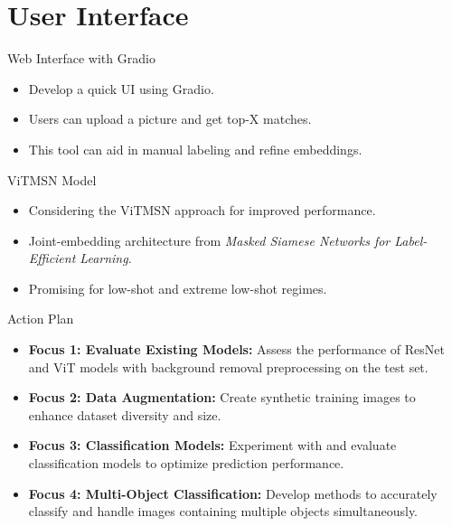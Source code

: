 \documentclass{beamer}
\begin{document}
\section{User Interface}
\begin{frame}{Web Interface with Gradio}
\begin{itemize}
    \item Develop a quick UI using Gradio.
    \item Users can upload a picture and get top-X matches.
    \item This tool can aid in manual labeling and refine embeddings.
\end{itemize}
\end{frame}


\begin{frame}{ViTMSN Model}
\begin{itemize}
    \item Considering the ViTMSN approach for improved performance.
    \item Joint-embedding architecture from \emph{Masked Siamese Networks for Label-Efficient Learning}.
    \item Promising for low-shot and extreme low-shot regimes.
\end{itemize}
\end{frame}

\begin{frame}{Action Plan}
    \begin{itemize}
        \item \textbf{Focus 1: Evaluate Existing Models:} 
              Assess the performance of ResNet and ViT models with background removal preprocessing on the test set.
        \item \textbf{Focus 2: Data Augmentation:} 
              Create synthetic training images to enhance dataset diversity and size.
        \item \textbf{Focus 3: Classification Models:} 
              Experiment with and evaluate classification models to optimize prediction performance.
        \item \textbf{Focus 4: Multi-Object Classification:} 
              Develop methods to accurately classify and handle images containing multiple objects simultaneously.
    \end{itemize}
    \end{frame}
\end{document}
